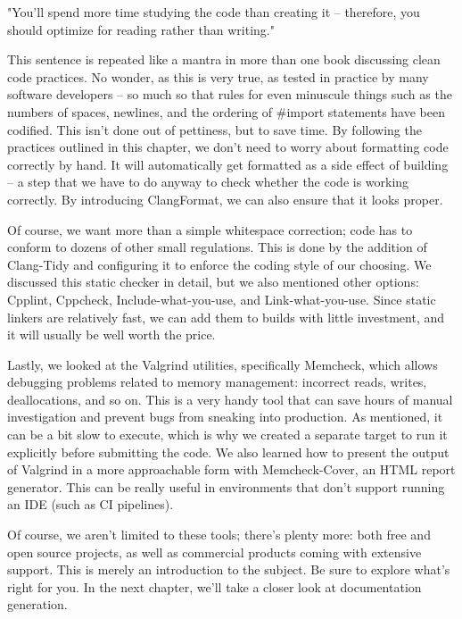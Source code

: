"You'll spend more time studying the code than creating it – therefore, you should optimize for reading rather than writing."

This sentence is repeated like a mantra in more than one book discussing clean code practices. No wonder, as this is very true, as tested in practice by many software developers – so much so that rules for even minuscule things such as the numbers of spaces, newlines, and the ordering of \#import statements have been codified. This isn't done out of pettiness, but to save time. By following the practices outlined in this chapter, we don't need to worry about formatting code correctly by hand. It will automatically get formatted as a side effect of building – a step that we have to do anyway to check whether the code is working correctly. By introducing ClangFormat, we can also ensure that it looks proper.

Of course, we want more than a simple whitespace correction; code has to conform to dozens of other small regulations. This is done by the addition of Clang-Tidy and configuring it to enforce the coding style of our choosing. We discussed this static checker in detail, but we also mentioned other options: Cpplint, Cppcheck, Include-what-you-use, and Link-what-you-use. Since static linkers are relatively fast, we can add them to builds with little investment, and it will usually be well worth the price.

Lastly, we looked at the Valgrind utilities, specifically Memcheck, which allows debugging problems related to memory management: incorrect reads, writes, deallocations, and so on. This is a very handy tool that can save hours of manual investigation and prevent bugs from sneaking into production. As mentioned, it can be a bit slow to execute, which is why we created a separate target to run it explicitly before submitting the code. We also learned how to present the output of Valgrind in a more approachable form with Memcheck-Cover, an HTML report generator. This can be really useful in environments that don't support running an IDE (such as CI pipelines).

Of course, we aren't limited to these tools; there's plenty more: both free and open source projects, as well as commercial products coming with extensive support. This is merely an introduction to the subject. Be sure to explore what's right for you. In the next chapter, we'll take a closer look at documentation generation.

